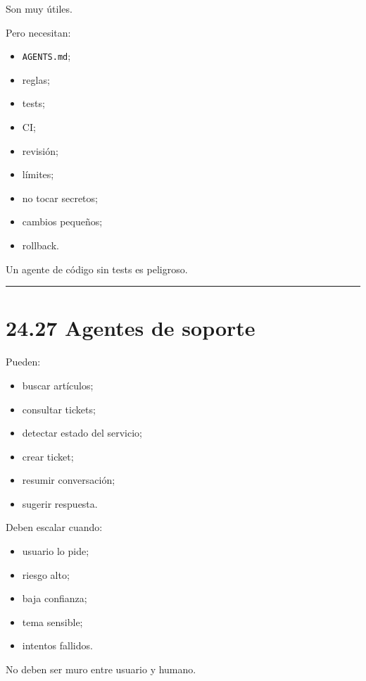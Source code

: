 Son muy útiles.

Pero necesitan:

\begin{itemize}
\tightlist
\item
  \passthrough{\lstinline!AGENTS.md!};
\item
  reglas;
\item
  tests;
\item
  CI;
\item
  revisión;
\item
  límites;
\item
  no tocar secretos;
\item
  cambios pequeños;
\item
  rollback.
\end{itemize}

Un agente de código sin tests es peligroso.

\begin{center}\rule{0.5\linewidth}{0.5pt}\end{center}

\section{24.27 Agentes de soporte}\label{agentes-de-soporte}

Pueden:

\begin{itemize}
\tightlist
\item
  buscar artículos;
\item
  consultar tickets;
\item
  detectar estado del servicio;
\item
  crear ticket;
\item
  resumir conversación;
\item
  sugerir respuesta.
\end{itemize}

Deben escalar cuando:

\begin{itemize}
\tightlist
\item
  usuario lo pide;
\item
  riesgo alto;
\item
  baja confianza;
\item
  tema sensible;
\item
  intentos fallidos.
\end{itemize}

No deben ser muro entre usuario y humano.

